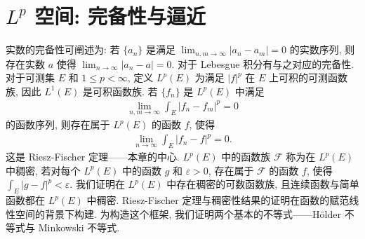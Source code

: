 \documentclass[../main.tex]{subfiles}
\begin{document}
\chapter{$L^{p}$ 空间: 完备性与逼近}\label{chapter:ch07-Lp空间}

实数的完备性可阐述为: 若 $\{a_{n}\}$ 是满足 $\lim_{n,m\to\infty}|a_{n}-a_{m}|=0$ 的实数序列, 则存在实数 $a$ 使得 $\lim_{n\to\infty}|a_{n}-a|=0$. 对于 Lebesgue 积分有与之对应的完备性. 对于可测集 $E$ 和 $1\leqslant p<\infty$, 定义 $L^{p}(E)$ 为满足 $|f|^{p}$ 在 $E$ 上可积的可测函数族, 因此 $L^{1}(E)$ 是可积函数族. 若 $\{f_{n}\}$ 是 $L^{p}(E)$ 中满足
\begin{align*}
\lim_{n,m\to\infty}\int_{E}|f_{n}-f_{m}|^{p}=0
\end{align*}
的函数序列, 则存在属于 $L^{p}(E)$ 的函数 $f$, 使得
\begin{align*}
\lim_{n\to\infty}\int_{E}|f_{n}-f|^{p}=0.
\end{align*}
这是 Riesz-Fischer 定理——本章的中心. $L^{p}(E)$ 中的函数族 $\mathcal{F}$ 称为在 $L^{p}(E)$ 中稠密, 若对每个 $L^{p}(E)$ 中的函数 $g$ 和 $\varepsilon>0$, 存在属于 $\mathcal{F}$ 的函数 $f$, 使得 $\int_{E}|g-f|^{p}<\varepsilon$. 我们证明在 $L^{p}(E)$ 中存在稠密的可数函数族, 且连续函数与简单函数都在 $L^{p}(E)$ 中稠密. Riesz-Fischer 定理与稠密性结果的证明在函数的赋范线性空间的背景下构建. 为构造这个框架, 我们证明两个基本的不等式——H\"older 不等式与 Minkowski 不等式.








\end{document}
